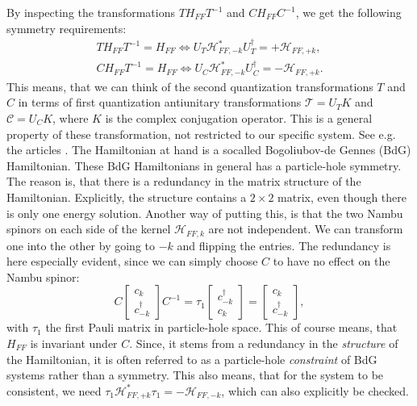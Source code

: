 By inspecting the transformations $TH_{FF}T^{-1}$ and $CH_{FF}C^{-1}$, we get the following symmetry requirements:
\begin{align}
TH_{FF}T^{-1} = H_{FF} \Leftrightarrow U_T\mathcal{H}^*_{FF,-k} U^\dagger_T = + \mathcal{H}_{FF,+k}, \nonumber \\
CH_{FF}T^{-1} = H_{FF} \Leftrightarrow U_C\mathcal{H}^*_{FF,-k} U^\dagger_C = - \mathcal{H}_{FF,+k}. 
\label{eq.Symmetryrequirements}
\end{align}
This means, that we can think of the second quantization transformations $T$ and $C$ in terms of first quantization antiunitary transformations $\mathcal{T} = U_TK$ and $\mathcal{C} = U_CK$, where $K$ is the complex conjugation operator. This is a general property of these transformation, not restricted to our specific system. See e.g. the articles \cite{Ludwig.Topology, Chiu.Topology}. The Hamiltonian at hand is a socalled Bogoliubov-de Gennes (BdG) Hamiltonian. These BdG Hamiltonians in general has a particle-hole symmetry. The reason is, that there is a redundancy in the matrix structure of the Hamiltonian. Explicitly, the structure contains a $2\times 2$ matrix, even though there is only one energy solution. Another way of putting this, is that the two Nambu spinors on each side of the kernel $\mathcal{H}_{FF,k}$ are not independent. We can transform one into the other by going to $-k$ and flipping the entries. The redundancy is here especially evident, since we can simply choose $C$ to have no effect on the Nambu spinor:
\begin{equation}
C \begin{bmatrix} c_k \\ c^\dagger_{-k} \end{bmatrix} C^{-1} =  \tau_1 \begin{bmatrix} c^\dagger_{-k} \\ c_{k} \end{bmatrix} = \begin{bmatrix} c_k \\ c^\dagger_{-k} \end{bmatrix}, 
\end{equation}
with $\tau_1$ the first Pauli matrix in particle-hole space. This of course means, that $H_{FF}$ is invariant under $C$. Since, it stems from a redundancy in the \textit{structure} of the Hamiltonian, it is often referred to as a particle-hole \textit{constraint} of BdG systems rather than a symmetry. This also means, that for the system to be consistent, we need $\tau_1\mathcal{H}^*_{FF,+k} \tau_1 = - \mathcal{H}_{FF,-k}$, which can also explicitly be checked. 

